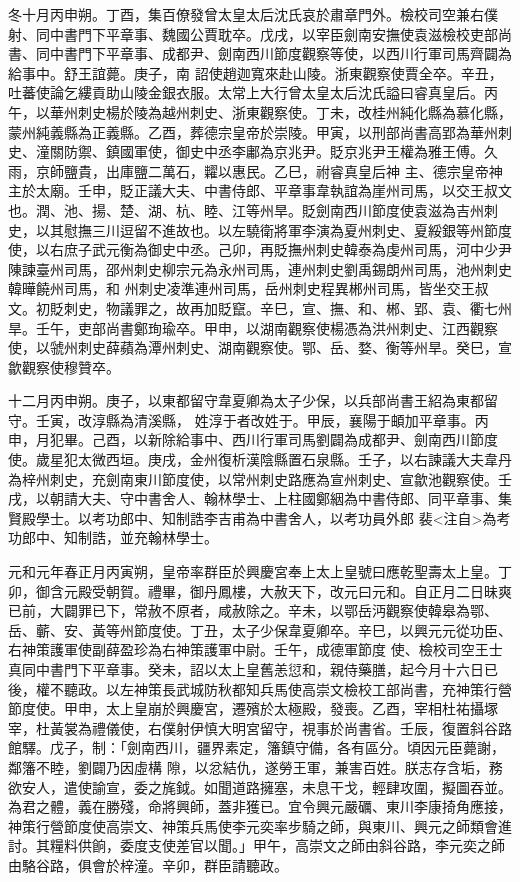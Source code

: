 \begin{pinyinscope}
 冬十月丙申朔。丁酉，集百僚發曾太皇太后沈氏哀於肅章門外。檢校司空兼右僕射、同中書門下平章事、魏國公賈耽卒。戊戌，以宰臣劍南安撫使袁滋檢校吏部尚書、同中書門下平章事、成都尹、劍南西川節度觀察等使，以西川行軍司馬齊闢為給事中。舒王誼薨。庚子，南
 詔使趙迦寬來赴山陵。浙東觀察使賈全卒。辛丑，吐蕃使論乞縷貢助山陵金銀衣服。太常上大行曾太皇太后沈氏謚曰睿真皇后。丙午，以華州刺史楊於陵為越州刺史、浙東觀察使。丁未，改桂州純化縣為慕化縣，蒙州純義縣為正義縣。乙酉，葬德宗皇帝於崇陵。甲寅，以刑部尚書高郢為華州刺史、潼關防禦、鎮國軍使，御史中丞李鄘為京兆尹。貶京兆尹王權為雅王傅。久雨，京師鹽貴，出庫鹽二萬石，糶以惠民。乙巳，祔睿真皇后神
 主、德宗皇帝神主於太廟。壬申，貶正議大夫、中書侍郎、平章事韋執誼為崖州司馬，以交王叔文也。潤、池、揚、楚、湖、杭、睦、江等州旱。貶劍南西川節度使袁滋為吉州刺史，以其慰撫三川逗留不進故也。以左驍衛將軍李演為夏州刺史、夏綏銀等州節度使，以右庶子武元衡為御史中丞。己卯，再貶撫州刺史韓泰為虔州司馬，河中少尹陳諫臺州司馬，邵州刺史柳宗元為永州司馬，連州刺史劉禹錫朗州司馬，池州刺史韓曄饒州司馬，和
 州刺史凌準連州司馬，岳州刺史程異郴州司馬，皆坐交王叔文。初貶刺史，物議罪之，故再加貶竄。辛巳，宣、撫、和、郴、郢、袁、衢七州旱。壬午，吏部尚書鄭珣瑜卒。甲申，以湖南觀察使楊憑為洪州刺史、江西觀察使，以虢州刺史薛蘋為潭州刺史、湖南觀察使。鄂、岳、婺、衡等州旱。癸巳，宣歙觀察使穆贊卒。



 十二月丙申朔。庚子，以東都留守韋夏卿為太子少保，以兵部尚書王紹為東都留守。壬寅，改淳縣為清溪縣，
 姓淳于者改姓于。甲辰，襄陽于頔加平章事。丙申，月犯畢。己酉，以新除給事中、西川行軍司馬劉闢為成都尹、劍南西川節度使。歲星犯太微西垣。庚戌，金州復析漢陰縣置石泉縣。壬子，以右諫議大夫韋丹為梓州刺史，充劍南東川節度使，以常州刺史路應為宣州刺史、宣歙池觀察使。壬戌，以朝請大夫、守中書舍人、翰林學士、上柱國鄭絪為中書侍郎、同平章事、集賢殿學士。以考功郎中、知制誥李吉甫為中書舍人，以考功員外郎
 裴<注自>為考功郎中、知制誥，並充翰林學士。



 元和元年春正月丙寅朔，皇帝率群臣於興慶宮奉上太上皇號曰應乾聖壽太上皇。丁卯，御含元殿受朝賀。禮畢，御丹鳳樓，大赦天下，改元曰元和。自正月二日昧爽已前，大闢罪已下，常赦不原者，咸赦除之。辛未，以鄂岳沔觀察使韓皋為鄂、岳、蘄、安、黃等州節度使。丁丑，太子少保韋夏卿卒。辛巳，以興元元從功臣、右神策護軍使副薛盈珍為右神策護軍中尉。壬午，成德軍節度
 使、檢校司空王士真同中書門下平章事。癸未，詔以太上皇舊恙愆和，親侍藥膳，起今月十六日已後，權不聽政。以左神策長武城防秋都知兵馬使高崇文檢校工部尚書，充神策行營節度使。甲申，太上皇崩於興慶宮，遷殯於太極殿，發喪。乙酉，宰相杜祐攝塚宰，杜黃裳為禮儀使，右僕射伊慎大明宮留守，視事於尚書省。壬辰，復置斜谷路館驛。戊子，制：「劍南西川，疆界素定，籓鎮守備，各有區分。頃因元臣薨謝，鄰籓不睦，劉闢乃因虛構
 隙，以忿結仇，遂勞王軍，兼害百姓。朕志存含垢，務欲安人，遣使諭宣，委之旄鉞。如聞道路擁塞，未息干戈，輕肆攻圍，擬圖吞並。為君之體，義在勝殘，命將興師，蓋非獲已。宜令興元嚴礪、東川李康掎角應接，神策行營節度使高崇文、神策兵馬使李元奕率步騎之師，與東川、興元之師類會進討。其糧料供餉，委度支使差官以聞。」甲午，高崇文之師由斜谷路，李元奕之師由駱谷路，俱會於梓潼。辛卯，群臣請聽政。




\end{pinyinscope}
